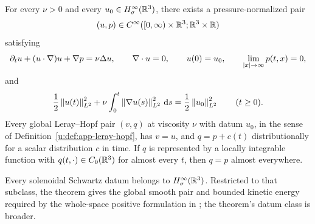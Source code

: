 \begin{maintheorem}
For every \(\nu>0\) and every \(u_0\in H^\infty_\sigma(\mathbb R^3)\), there exists a
pressure-normalized pair
\[
 (u,p)\in C^\infty([0,\infty)\times\mathbb R^3;\mathbb R^3\times\mathbb R)
\]
satisfying
\[
 \partial_tu+(u\cdot\nabla)u+\nabla p=\nu\Delta u,
 \qquad \nabla\cdot u=0,
 \qquad u(0)=u_0,
 \qquad \lim_{\left|x\right|\to\infty}p(t,x)=0,
\]
and
\[
 \frac12\left\lVert u(t)\right\rVert_{L^2}^2
 +\nu\int_0^t\left\lVert \nabla u(s)\right\rVert_{L^2}^2\,\mathrm d s
 =\frac12\left\lVert u_0\right\rVert_{L^2}^2
 \qquad(t\ge0).
\]
Every global Leray--Hopf pair \((v,q)\) at viscosity \(\nu\) with datum
\(u_0\), in the sense of Definition~\ref{u:def:app-leray-hopf}, has \(v=u\),
and \(q=p+c(t)\) distributionally for a scalar distribution \(c\) in time.
If \(q\) is represented by a locally integrable function with
\(q(t,\cdot)\in C_0(\mathbb R^3)\) for almost every \(t\), then \(q=p\) almost
everywhere.
\end{maintheorem}

Every solenoidal Schwartz datum belongs to \(H^\infty_\sigma(\mathbb R^3)\). Restricted
to that subclass, the theorem gives the global smooth pair and bounded
kinetic energy required by the whole-space positive formulation in
\cite{Fefferman2006}; the theorem's datum class is broader.
